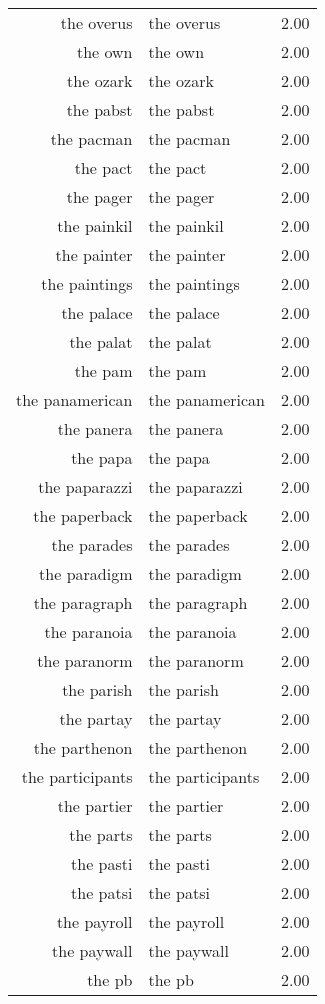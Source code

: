 \begin{table}[ht]
\begin{tabular}{rlr}
  the overus & the overus & 2.00 \\ 
  the own & the own & 2.00 \\ 
  the ozark & the ozark & 2.00 \\ 
  the pabst & the pabst & 2.00 \\ 
  the pacman & the pacman & 2.00 \\ 
  the pact & the pact & 2.00 \\ 
  the pager & the pager & 2.00 \\ 
  the painkil & the painkil & 2.00 \\ 
  the painter & the painter & 2.00 \\ 
  the paintings & the paintings & 2.00 \\ 
  the palace & the palace & 2.00 \\ 
  the palat & the palat & 2.00 \\ 
  the pam & the pam & 2.00 \\ 
  the panamerican & the panamerican & 2.00 \\ 
  the panera & the panera & 2.00 \\ 
  the papa & the papa & 2.00 \\ 
  the paparazzi & the paparazzi & 2.00 \\ 
  the paperback & the paperback & 2.00 \\ 
  the parades & the parades & 2.00 \\ 
  the paradigm & the paradigm & 2.00 \\ 
  the paragraph & the paragraph & 2.00 \\ 
  the paranoia & the paranoia & 2.00 \\ 
  the paranorm & the paranorm & 2.00 \\ 
  the parish & the parish & 2.00 \\ 
  the partay & the partay & 2.00 \\ 
  the parthenon & the parthenon & 2.00 \\ 
  the participants & the participants & 2.00 \\ 
  the partier & the partier & 2.00 \\ 
  the parts & the parts & 2.00 \\ 
  the pasti & the pasti & 2.00 \\ 
  the patsi & the patsi & 2.00 \\ 
  the payroll & the payroll & 2.00 \\ 
  the paywall & the paywall & 2.00 \\ 
  the pb & the pb & 2.00 \\ 

\end{tabular}
\end{table}
